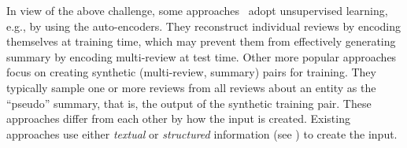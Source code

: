 In view of the above challenge, some approaches~\cite{MeanSum19,Copycat20,tree21}
adopt unsupervised learning, e.g., by using the auto-encoders.
They reconstruct individual reviews by encoding themselves
at training time, which may prevent them from effectively generating summary by 
encoding multi-review at test time. 
Other more popular approaches~\cite{Denoise20,Fewshot20,Plansum20,transsum21} 
focus on creating synthetic (multi-review, summary) pairs for training.
They typically sample one or more reviews from all reviews 
about an entity
as the ``pseudo'' summary, that is, the output of the synthetic training pair.
These approaches differ from each other by how the input is created.
Existing approaches use either {\em textual} or  {\em structured} information (see )
to create the input.

